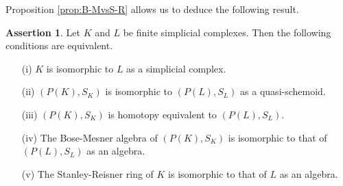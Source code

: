 \documentclass{amsart}
\theoremstyle{definition}
\newtheorem{assertion}[thm]{Assertion}
\theoremstyle{remark}
\begin{document}
Proposition \ref{prop:B-MvsS-R} allows us to deduce the following result. 

\begin{assertion} \label{assertion:simplicial_complexes} Let $K$ and $L$ be finite simplicial complexes. 
Then the following conditions are equivalent.
\begin{itemize}
\item[(i)] $K$ is isomorphic to $L$ as a simplicial complex.
\item[(ii)] $(P(K), S_K)$ is isomorphic to $(P(L), S_L)$ as a quasi-schemoid. 
\item[(iii)] $(P(K), S_K)$ is homotopy equivalent to $(P(L), S_L)$. %
\item[(iv)] The Bose-Mesner algebra of $(P(K), S_K)$ is isomorphic to that of $(P(L), S_L)$ as an algebra. 
\item[(v)] The Stanley-Reisner ring of $K$ is isomorphic to that  of $L$ as an algebra.  
\end{itemize}
\end{assertion}
\end{document}
